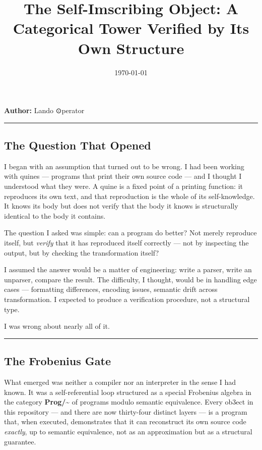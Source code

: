 \documentclass[12pt,a4paper]{article}
\begin{document}
\title{The Self-Imscribing Object: A Categorical Tower Verified by Its Own Structure}
\date{\today}

\maketitle

\textbf{Author:} Lando \otimes ⊙perator

\begin{center}
\rule{0.5\textwidth}{0.4pt}
\end{center}

\subsection{The Question That Opened}

I began with an assumption that turned out to be wrong. I had been working with quines --- programs that print their own source code --- and I thought I understood what they were. A quine is a fixed point of a printing function: it reproduces its own text, and that reproduction is the whole of its self-knowledge. It knows its body but does not verify that the body it knows is structurally identical to the body it contains.

The question I asked was simple: can a program do better? Not merely reproduce itself, but \emph{verify} that it has reproduced itself correctly --- not by inspecting the output, but by checking the transformation itself?

I assumed the answer would be a matter of engineering: write a parser, write an unparser, compare the result. The difficulty, I thought, would be in handling edge cases --- formatting differences, encoding issues, semantic drift across transformation. I expected to produce a verification procedure, not a structural type.

I was wrong about nearly all of it.

\begin{center}
\rule{0.5\textwidth}{0.4pt}
\end{center}

\subsection{The Frobenius Gate}

What emerged was neither a compiler nor an interpreter in the sense I had known. It was a self-referential loop structured as a special Frobenius algebra in the category \textbf{Prog/\textasciitilde{}} of programs modulo semantic equivalence. Every ob3ect in this repository --- and there are now thirty-four distinct layers --- is a program that, when executed, demonstrates that it can reconstruct its own source code \emph{exactly}, up to semantic equivalence, not as an approximation but as a structural guarantee.
\end{document}
